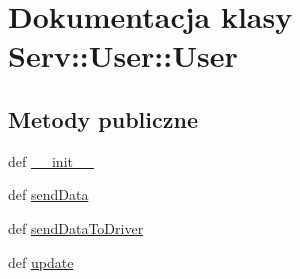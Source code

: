 \hypertarget{class_serv_1_1_user_1_1_user}{
\section{Dokumentacja klasy Serv::User::User}
\label{class_serv_1_1_user_1_1_user}
}
\subsection*{Metody publiczne}
\begin{CompactItemize}
\item 
def \hyperlink{class_serv_1_1_user_1_1_user_e503b7d48b7eb7c8a399f2652a3ff002}{\_\-\_\-init\_\-\_\-}
\item 
def \hyperlink{class_serv_1_1_user_1_1_user_2d0441db55283b641079acb8bf67c30a}{sendData}
\item 
def \hyperlink{class_serv_1_1_user_1_1_user_0907f262b618e5b6c05c6e3584e24b44}{sendDataToDriver}
\item 
def \hyperlink{class_serv_1_1_user_1_1_user_90697aec786a688ec3308b3ebdcc83a3}{update}
\end{CompactItemize}

